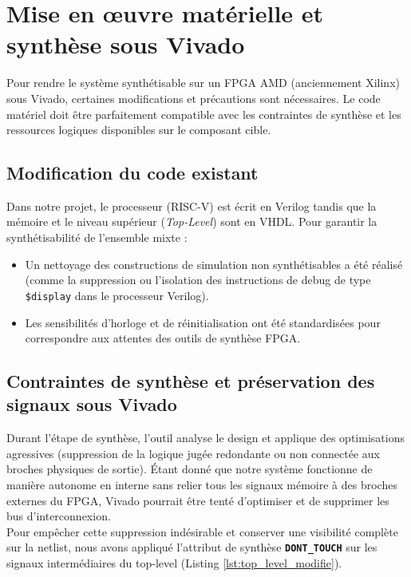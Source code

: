 \section{Mise en œuvre matérielle et synthèse sous Vivado}

Pour rendre le système synthétisable sur un FPGA AMD (anciennement Xilinx) sous Vivado, certaines modifications et précautions sont nécessaires. Le code matériel doit être parfaitement compatible avec les contraintes de synthèse et les ressources logiques disponibles sur le composant cible.
\\

\subsection{Modification du code existant}

Dans notre projet, le processeur (RISC-V) est écrit en Verilog tandis que la mémoire et le niveau supérieur (\textit{Top-Level}) sont en VHDL. Pour garantir la synthétisabilité de l'ensemble mixte :
\begin{itemize}
    \item Un nettoyage des constructions de simulation non synthétisables a été réalisé (comme la suppression ou l'isolation des instructions de debug de type \texttt{\$display} dans le processeur Verilog).
    \item Les sensibilités d'horloge et de réinitialisation ont été standardisées pour correspondre aux attentes des outils de synthèse FPGA.
\end{itemize}

\subsection{Contraintes de synthèse et préservation des signaux sous Vivado}

Durant l'étape de synthèse, l'outil analyse le design et applique des optimisations agressives (suppression de la logique jugée redondante ou non connectée aux broches physiques de sortie). Étant donné que notre système fonctionne de manière autonome en interne sans relier tous les signaux mémoire à des broches externes du FPGA, Vivado pourrait être tenté d'optimiser et de supprimer les bus d'interconnexion.
\\

Pour empêcher cette suppression indésirable et conserver une visibilité complète sur la netlist, nous avons appliqué l'attribut de synthèse \textbf{\texttt{DONT\_TOUCH}} sur les signaux intermédiaires du top-level (Listing \ref{lst:top_level_modifie}).
\\

